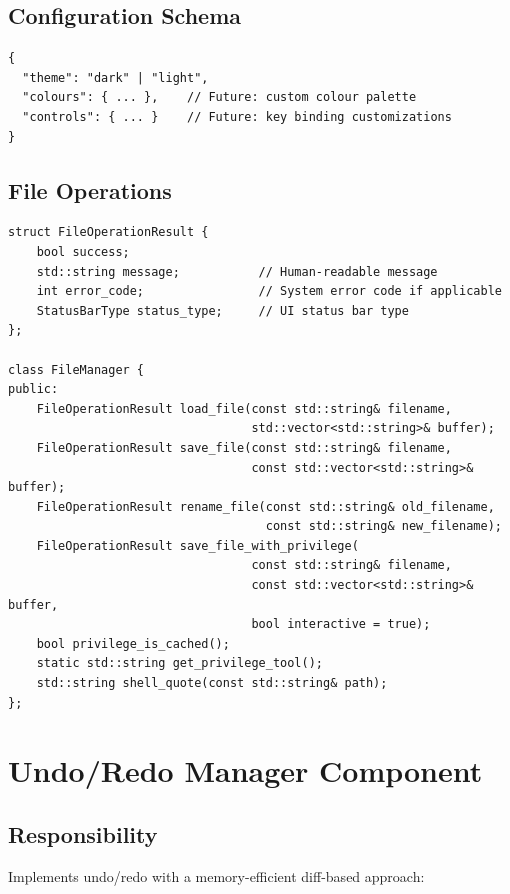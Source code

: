 \documentclass[12pt,a4paper,oneside,openany]{report}
\begin{document}
\subsection{Configuration Schema}

\begin{lstlisting}
{
  "theme": "dark" | "light",
  "colours": { ... },    // Future: custom colour palette
  "controls": { ... }    // Future: key binding customizations
}
\end{lstlisting}

\newpage
\subsection{File Operations}

\begin{lstlisting}
struct FileOperationResult {
    bool success;
    std::string message;           // Human-readable message
    int error_code;                // System error code if applicable
    StatusBarType status_type;     // UI status bar type
};

class FileManager {
public:
    FileOperationResult load_file(const std::string& filename,
                                  std::vector<std::string>& buffer);
    FileOperationResult save_file(const std::string& filename,
                                  const std::vector<std::string>& buffer);
    FileOperationResult rename_file(const std::string& old_filename,
                                    const std::string& new_filename);
    FileOperationResult save_file_with_privilege(
                                  const std::string& filename,
                                  const std::vector<std::string>& buffer,
                                  bool interactive = true);
    bool privilege_is_cached();
    static std::string get_privilege_tool();
    std::string shell_quote(const std::string& path);
};
\end{lstlisting}

\section{Undo/Redo Manager Component}

\subsection{Responsibility}

Implements undo/redo with a memory-efficient diff-based approach:
\end{document}
